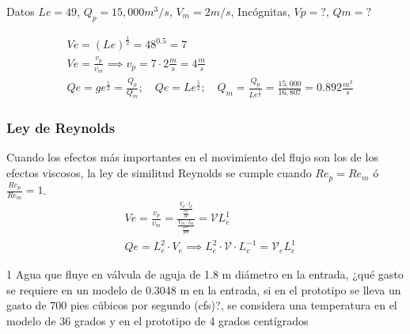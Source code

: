Datos $Le=49$, $Q_p = 15,000 m^3/s$, $V_m = 2m/s$, Incógnitas, $Vp=?$, $Qm=?$

\begin{align*}
    &Ve =\left(Le\right)^{\frac{1}{2}} = 48^{0.5} = 7\\
    &Ve = \frac{v_p}{v_m} \implies v_p = 7\cdot 2\frac{m}{s} = 4\frac{m}{s}\\
    &Qe = ge^{\frac{1}{2}} = \frac{Q_p}{Q_m};\quad Qe = Le^{\frac{5}{2}};\quad Q_m = \frac{Q_p}{Le^{\frac{5}{2}}} = \frac{15,000}{16,807} = 0.892 \frac{m^3}{s}
\end{align*}

\subsubsection{Ley de Reynolds}

Cuando los efectos más importantes en el movimiento del flujo son los de los efectos viscosos, la ley de similitud Reynolds se cumple cuando $Re_p=Re_m$ ó $\frac{Re_p}{Re_m}=1$.
\begin{align*}
    &Ve = \frac{v_p}{v_m} =\frac{\frac{V_p\cdot l_p}{\frac{\mu p}{\rho p}}}{\frac{V_m\cdot l_m}{\frac{\mu m}{\rho m}}} =\mathcal{V}L_e^{ 1}\\
    &Qe = L_e^2\cdot V_e\implies L_e^2\cdot \mathcal{V}\cdot L_e^{ -1} = \mathcal{V}_e L_e^{1}
\end{align*}
\begin{example}
    1 Agua que fluye en válvula de aguja de 1.8 m diámetro en la entrada, ¿qué gasto se requiere en un modelo de
0.3048 m en la entrada, si en el prototipo se lleva un gasto de 700 pies cúbicos por segundo (cfs)?, se
considera una temperatura en el modelo de 36 grados y en el prototipo de 4 grados centígrados
\end{example}



